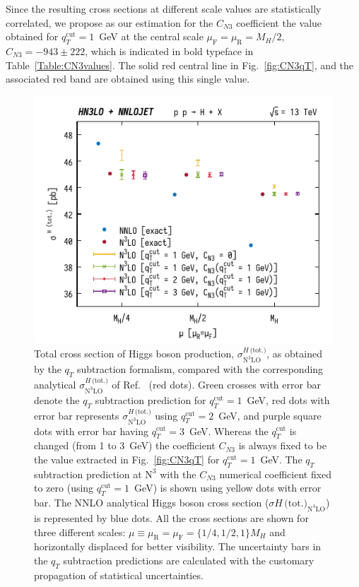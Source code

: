 \documentclass[12pt]{article}
\DeclareRobustCommand{\mur}{\ensuremath{\mu_{\mathrm{R}}}\xspace}
\DeclareRobustCommand{\muR}{\mur}
\DeclareRobustCommand{\muf}{\ensuremath{\mu_{\mathrm{F}}}\xspace}
\DeclareRobustCommand{\muF}{\muf}
\DeclareRobustCommand{\qt}{\ensuremath{q_T}\xspace}
\DeclareRobustCommand{\qtcut}{\ensuremath{q_T^\mathrm{cut}}\xspace}
\DeclareRobustCommand{\tot}{\text{(tot.)}\xspace}
\DeclareRobustCommand{\LO}{\text{LO}\xspace}
\DeclareRobustCommand{\N}[1]{\ensuremath{\text{N}^{#1}}} %
\begin{document}
Since the resulting cross sections at different scale values are statistically correlated, we propose as our estimation for the $C_{N3}$ coefficient the value obtained for  $\qtcut=1$~GeV   at the central scale $\muF=\muR=M_{H}/2$, $C_{N3}=-943 \pm 222$, which is indicated in bold typeface in Table~\ref{Table:CN3values}.
The solid red central line in Fig.~\ref{fig:CN3qT}, and the associated red band are obtained using this single value. 

\begin{figure}
\centering
\includegraphics[width=.6\linewidth]{./new_figures/totXsecN3LO}
\caption{\label{fig:totXsecN3LO}{Total cross section of Higgs boson production, $\sigma^{H\,\tot}_{\N{3}\LO}$, as obtained by the $\qt$ subtraction formalism, compared with the corresponding analytical $\sigma^{H\,\tot}_{\N3\LO}$ of Ref.~\cite{Mistlberger:2018etf} (red dots). Green crosses with error bar denote the $\qt$ subtraction prediction for $\qtcut=1$~GeV, red dots with error bar represents  $\sigma^{H\,\tot}_{\N3\LO}$ using $\qtcut=2$~GeV, and purple square dots with error bar having $\qtcut=3$~GeV. Whereas the $\qtcut$ is changed (from 1 to 3~GeV) the coefficient $C_{N3}$ is always fixed to be the value extracted in Fig.~\ref{fig:CN3qT} for $\qtcut=1$~GeV. The $\qt$ subtraction prediction at \N3\LO with the $C_{N3}$ numerical coefficient fixed to zero (using $\qtcut=1$~GeV) is shown using yellow dots with error bar. The NNLO analytical Higgs boson cross section ($\sigma{{H\,\tot}}_{\N3\LO}$) is represented by blue dots. All the cross sections are shown for three different scales: $\mu \equiv \muR = \muF = \{1/4,1/2,1 \} M_H$ and horizontally displaced for better visibility. The uncertainty bars in the $\qt$ subtraction predictions are calculated with the customary propagation of statistical uncertainties.}}
\end{figure}
\end{document}
